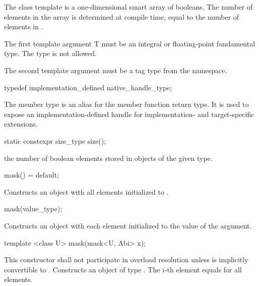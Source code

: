 

\pnum The class template \mask[<T, Abi>] is a one-dimensional smart array of booleans.
The number of elements in the array is determined at compile time, equal to the number of elements in \datapar[<T, Abi>].

\pnum The first template argument \type T must be an integral or floating-point fundamental type.
The type \bool is not allowed.

\pnum The second template argument  must be a tag type from the  namespace.

\begin{itemdecl}
typedef implementation_defined native_handle_type;
\end{itemdecl}
\begin{itemdescr}
  \pnum The  member type is an alias for the  member function return type.
  It is used to expose an implementation-defined handle for implementation- and target-specific extensions.
\end{itemdescr}

\begin{itemdecl}
static constexpr size_type size();
\end{itemdecl}
\begin{itemdescr}
  \pnum\returns the number of boolean elements stored in objects of the given \mask[<T, Abi>] type.
\end{itemdescr}

\begin{itemdecl}
mask() = default;
\end{itemdecl}
\begin{itemdescr}
  \pnum\effects Constructs an object with all elements initialized to .
\end{itemdescr}

\begin{itemdecl}
mask(value_type);
\end{itemdecl}
\begin{itemdescr}
  \pnum\effects Constructs an object with each element initialized to the value of the argument.
\end{itemdescr}

\begin{itemdecl}
template <class U> mask(mask<U, Abi> x);
\end{itemdecl}
\begin{itemdescr}
  \pnum\remarks This constructor shall not participate in overload resolution unless
    \datapar[<U, Abi>] is implicitly convertible to \datapar[<T, Abi>].
  \pnum\effects Constructs an object of type \mask.
  \pnum\postcondition The $i$-th element equals  for all elements.
\end{itemdescr}

